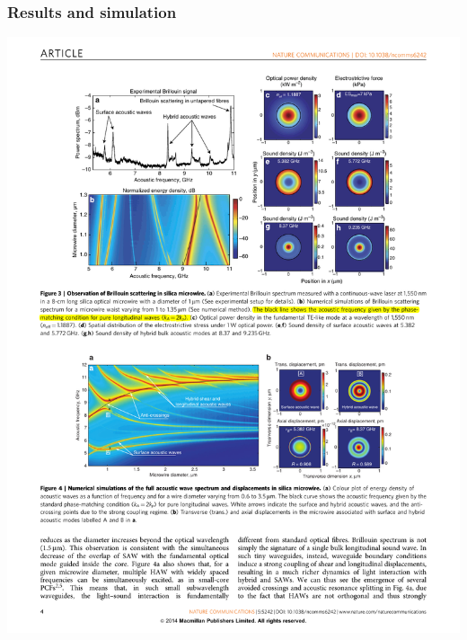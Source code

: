 \documentclass{beamer}
\begin{document}
\begin{frame}
\frametitle{Results and simulation}
\begin{center}
\includegraphics[width=1.0\columnwidth]{f3.pdf}
\end{center}
\end{frame}
\end{document}

